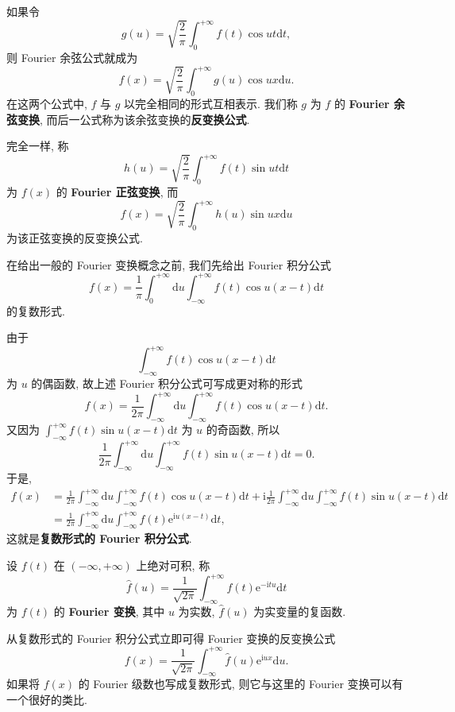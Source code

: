 如果令
\[
  g(u)=\sqrt{\frac{2}{\pi}}\int_{0}^{+\infty}f(t)\cos ut\mathrm{d}t,
\]
则 Fourier 余弦公式就成为
\[
  f(x)=\sqrt{\frac{2}{\pi}}\int_{0}^{+\infty}g(u)\cos ux\mathrm{d}u.
\]
在这两个公式中, $f$ 与 $g$ 以完全相同的形式互相表示. 我们称 $g$ 为 $f$ 的 \textbf{Fourier 余弦变换}, 而后一公式称为该余弦变换的\textbf{反变换公式}.

完全一样, 称
\[
  h(u)=\sqrt{\frac{2}{\pi}}\int_{0}^{+\infty}f(t)\sin ut\mathrm{d}t
\]
为 $f(x)$ 的 \textbf{Fourier 正弦变换}, 而
\[
  f(x)=\sqrt{\frac{2}{\pi}}\int_{0}^{+\infty}h(u)\sin ux\mathrm{d}u
\]
为该正弦变换的反变换公式.

在给出一般的 Fourier 变换概念之前, 我们先给出 Fourier 积分公式
\[
  f(x)=\frac{1}{\pi}\int_{0}^{+\infty}\mathrm{d}u\int_{-\infty}^{+\infty}f(t)\cos u(x-t)\mathrm{d}t
\]
的复数形式.

由于
\[
  \int_{-\infty}^{+\infty}f(t)\cos u(x-t)\mathrm{d}t
\]
为 $u$ 的偶函数, 故上述 Fourier 积分公式可写成更对称的形式
\[
  f(x)=\frac{1}{2\pi}\int_{-\infty}^{+\infty}\mathrm{d}u\int_{-\infty}^{+\infty}f(t)\cos u(x-t)\mathrm{d}t.
\]
又因为 $\displaystyle\int_{-\infty}^{+\infty}f(t)\sin u(x-t)\mathrm{d}t$ 为 $u$ 的奇函数, 所以
\[
  \frac{1}{2\pi}\int_{-\infty}^{+\infty}\mathrm{d}u\int_{-\infty}^{+\infty}f(t)\sin u(x-t)\mathrm{d}t=0.
\]
于是,
\begin{align*}
  f(x)&=\frac{1}{2\pi}\int_{-\infty}^{+\infty}\mathrm{d}u\int_{-\infty}^{+\infty}f(t)\cos u(x-t)\mathrm{d}t+\mathrm{i}\frac{1}{2\pi}\int_{-\infty}^{+\infty}\mathrm{d}u\int_{-\infty}^{+\infty}f(t)\sin u(x-t)\mathrm{d}t\\
  &=\frac{1}{2\pi}\int_{-\infty}^{+\infty}\mathrm{d}u\int_{-\infty}^{+\infty}f(t)\mathrm{e}^{\mathrm{i}u(x-t)}\mathrm{d}t,
\end{align*}
这就是\textbf{复数形式的 Fourier 积分公式}.

\begin{definition}\label{def:16.3.1}
设 $f(t)$ 在 $(-\infty,+\infty)$ 上绝对可积, 称
\[
  \hat{f}(u)=\frac{1}{\sqrt{2\pi}}\int_{-\infty}^{+\infty}f(t)\mathrm{e}^{-\mathrm{i}tu}\mathrm{d}t
\]
为 $f(t)$ 的 \textbf{Fourier 变换}, 其中 $u$ 为实数, $\hat{f}(u)$ 为实变量的复函数.
\end{definition}

从复数形式的 Fourier 积分公式立即可得 Fourier 变换的反变换公式
\[
  f(x)=\frac{1}{\sqrt{2\pi}}\int_{-\infty}^{+\infty}\hat{f}(u)\mathrm{e}^{\mathrm{i}ux}\mathrm{d}u.
\]
如果将 $f(x)$ 的 Fourier 级数也写成复数形式, 则它与这里的 Fourier 变换可以有一个很好的类比.

